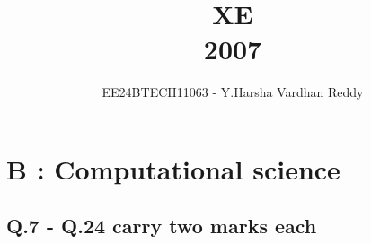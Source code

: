 \documentclass[journal,,12pt,onecolumn]{IEEEtran}
\theoremstyle{remark}
\begin{document}

\vspace{3cm}

\title{XE\\2007}
\author{EE24BTECH11063 - Y.Harsha Vardhan Reddy}
\maketitle

\bigskip

\renewcommand{\thefigure}{\theenumi}
\renewcommand{\thetable}{\theenumi}

\section*{B : Computational science}
\subsection*{Q.7 - Q.24 carry two marks each}
\end{document}

